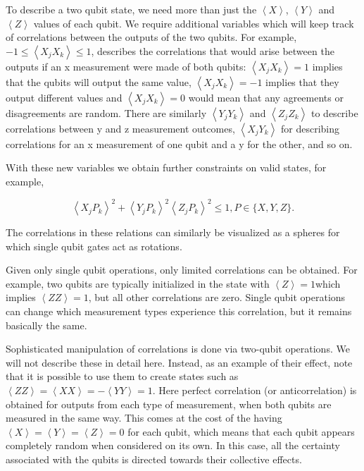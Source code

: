 \documentclass[conference]{IEEEtran}
\begin{document}
To describe a two qubit state, we need more than just the $\left\langle X\right\rangle$, $\left\langle Y\right\rangle$ and $\left\langle Z\right\rangle$  values of each qubit. We require additional variables which will keep track of correlations between the outputs of the two qubits. For example, $-1 \leq \left\langle X_j X_k \right\rangle \leq 1$, describes the correlations that would arise between the outputs if an x measurement were made of both qubits: $\left\langle X_j X_k\right\rangle = 1$ implies that the qubits will output the same value, $\left\langle X_j X_k\right\rangle = -1$ implies that they output different values and $\left\langle X_j X_k\right\rangle = 0$ would mean that any agreements or disagreements are random. There are similarly $\left\langle Y_j Y_k\right\rangle$ and $\left\langle Z_j Z_k\right\rangle$ to describe correlations between y and z measurement outcomes, $\left\langle X_j Y_k \right\rangle$ for describing correlations for an x measurement of one qubit and a y for the other, and so on.

With these new variables we obtain further constraints on valid states, for example,

\begin{equation} \label{heisenberg2}
\left\langle X_j P_k \right\rangle^2 + \left\langle Y_j P_k \right\rangle^2 \left\langle Z_j P_k \right\rangle^2 \leq 1, P \in \{X,Y,Z\}.
\end{equation}

The correlations in these relations can similarly be visualized as a spheres for which single qubit gates act as rotations.

Given only single qubit operations, only limited correlations can be obtained. For example, two qubits are typically initialized in the state with $\left\langle Z\right\rangle =1$which implies $\left\langle ZZ\right\rangle =1$, but all other correlations are zero. Single qubit operations can change which measurement types experience this correlation, but it remains basically the same.

Sophisticated manipulation of correlations is done via two-qubit operations. We will not describe these in detail here. Instead, as an example of their effect, note that it is possible to use them to create states such as  $\left\langle ZZ\right\rangle =\left\langle XX\right\rangle =-\left\langle YY\right\rangle = 1$. Here perfect correlation (or anticorrelation) is obtained for outputs from each type of measurement, when both qubits are measured in the same way. This comes at the cost of the having $\left\langle X\right\rangle=\left\langle Y\right\rangle=\left\langle Z\right\rangle =0$ for each qubit, which means that each qubit appears completely random when considered on its own. In this case, all the certainty associated with the qubits is directed towards their collective effects.
\end{document}
